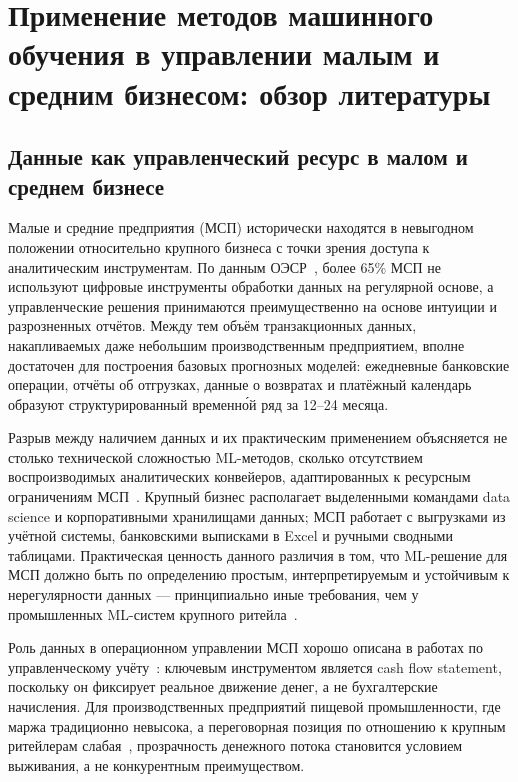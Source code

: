 \chapter{Применение методов машинного обучения в управлении малым и средним бизнесом: обзор литературы}

\section{Данные как управленческий ресурс в малом и среднем бизнесе}

Малые и средние предприятия (МСП) исторически находятся в невыгодном положении относительно крупного бизнеса с точки зрения доступа к аналитическим инструментам. По данным ОЭСР~\cite{oecd2021sme}, более 65\% МСП не используют цифровые инструменты обработки данных на регулярной основе, а управленческие решения принимаются преимущественно на основе интуиции и разрозненных отчётов. Между тем объём транзакционных данных, накапливаемых даже небольшим производственным предприятием, вполне достаточен для построения базовых прогнозных моделей: ежедневные банковские операции, отчёты об отгрузках, данные о возвратах и платёжный календарь образуют структурированный временно́й ряд за 12--24 месяца.

Разрыв между наличием данных и их практическим применением объясняется не столько технической сложностью ML-методов, сколько отсутствием воспроизводимых аналитических конвейеров, адаптированных к ресурсным ограничениям МСП~\cite{sculley2015hidden}. Крупный бизнес располагает выделенными командами data science и корпоративными хранилищами данных; МСП работает с выгрузками из учётной системы, банковскими выписками в Excel и ручными сводными таблицами. Практическая ценность данного различия в том, что ML-решение для МСП должно быть по определению простым, интерпретируемым и устойчивым к нерегулярности данных --- принципиально иные требования, чем у промышленных ML-систем крупного ритейла~\cite{makridakis2022m5}.

Роль данных в операционном управлении МСП хорошо описана в работах по управленческому учёту~\cite{whittington2012principles}: ключевым инструментом является cash flow statement, поскольку он фиксирует реальное движение денег, а не бухгалтерские начисления. Для производственных предприятий пищевой промышленности, где маржа традиционно невысока, а переговорная позиция по отношению к крупным ритейлерам слабая~\cite{sme_profitability_ru}, прозрачность денежного потока становится условием выживания, а не конкурентным преимуществом.

